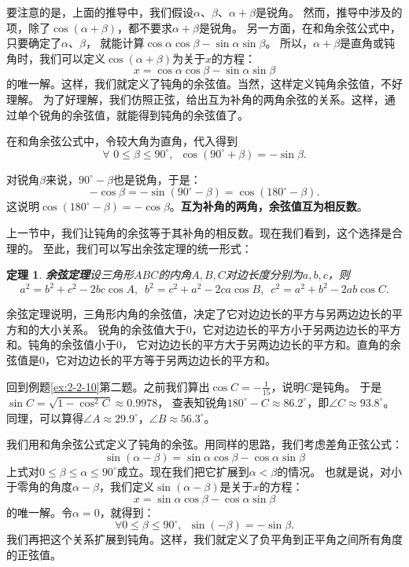 \documentclass[12pt,UTF8]{ctexbook}
\newtheorem{tm}{定理}[section]
\begin{document}
要注意的是，上面的推导中，我们假设$\alpha$、$\beta$、$\alpha + \beta$是锐角。
然而，推导中涉及的项，除了$\cos(\alpha + \beta)$，都不要求$\alpha + \beta$是锐角。
另一方面，在和角余弦公式中，只要确定了$\alpha$、$\beta$，
就能计算$\cos \alpha \cos \beta - \sin\alpha \sin \beta$。
所以，$\alpha + \beta$是直角或钝角时，我们可以定义$\cos(\alpha + \beta)$为关于$x$的方程：
$$  x = \cos \alpha \cos \beta - \sin\alpha \sin \beta $$
的唯一解。这样，我们就定义了钝角的余弦值。当然，这样定义钝角余弦值，不好理解。
为了好理解，我们仿照正弦，给出互为补角的两角余弦的关系。这样，通过单个锐角的余弦值，就能得到钝角的余弦值了。

在和角余弦公式中，令较大角为直角，代入得到
$$  \forall \,\, 0 \leqslant \beta \leqslant 90^\circ , \,\,\, \cos(90^\circ + \beta) = - \sin\beta. $$

对锐角$\beta$来说，$90^\circ - \beta$也是锐角，于是：
$$ -\cos \beta = - \sin(90^\circ - \beta) = \cos(180^\circ - \beta). $$
这说明$ \cos(180^\circ - \beta) =  -\cos \beta$。\textbf{互为补角的两角，余弦值互为相反数}。

上一节中，我们让钝角的余弦等于其补角的相反数。现在我们看到，这个选择是合理的。
至此，我们可以写出余弦定理的统一形式：

\begin{tm}{\textbf{余弦定理}}\label{tm:2-4-10}
    设三角形$ABC$的内角$A,B,C$对边长度分别为$a,b,c$，则
    $$ a^2 = b^2 + c^2 - 2bc\cos A, \,\,\, b^2 = c^2 + a^2 - 2ca\cos B, \,\,\, c^2 = a^2 + b^2 - 2ab\cos C. $$
\end{tm}
余弦定理说明，三角形内角的余弦值，决定了它对边边长的平方与另两边边长的平方和的大小关系。
锐角的余弦值大于$0$，它对边边长的平方小于另两边边长的平方和。钝角的余弦值小于$0$，
它对边边长的平方大于另两边边长的平方和。直角的余弦值是$0$，它对边边长的平方等于另两边边长的平方和。

回到例题\ref{ex:2-2-10}第二题。之前我们算出$\cos C = -\frac{1}{15}$，说明$C$是钝角。
于是$\sin C = \sqrt{1 - \cos^2 C} \approx 0.9978$，
查表知锐角$180^\circ - C \approx 86.2^\circ$，即$\angle C \approx 93.8^\circ$。
同理，可以算得$\angle A \approx 29.9^\circ$，$\angle B \approx 56.3^\circ$。

我们用和角余弦公式定义了钝角的余弦。用同样的思路，我们考虑差角正弦公式：
$$ \sin(\alpha - \beta) = \sin\alpha \cos \beta - \cos \alpha \sin\beta $$
上式对$0 \leqslant \beta \leqslant \alpha \leqslant 90^\circ$成立。现在我们把它扩展到$\alpha < \beta$的情况。
也就是说，对小于零角的角度$\alpha - \beta$，我们定义$\sin (\alpha - \beta)$是关于$x$的方程：
$$ x = \sin\alpha \cos \beta - \cos \alpha \sin\beta $$
的唯一解。令$\alpha = 0$，就得到：
$$ \forall 0 \leqslant \beta \leqslant 90^\circ , \,\,\, \sin(- \beta) = -\sin\beta. $$
我们再把这个关系扩展到钝角。这样，我们就定义了负平角到正平角之间所有角度的正弦值。
\end{document}
